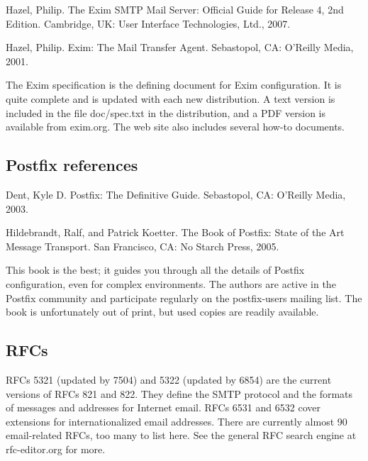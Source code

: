 {Hazel, Philip}. {The Exim SMTP Mail Server: Official Guide for Release
4, 2nd Edition}. Cambridge, UK: User Interface Technologies, Ltd., 2007.

{Hazel, Philip}. {Exim: The Mail Transfer Agent}. Sebastopol, CA:
O'Reilly Media, 2001.

The Exim specification is the defining document for Exim configuration.
It is quite complete and is updated with each new distribution. A text
version is included in the file {doc/spec.txt} in the distribution, and
a PDF version is available from {exim.org}. The web site also includes
several how-to documents.

\protect\hypertarget{part0026_split_068.html}{}{}

\hypertarget{part0026_split_068.htmlux5cux23_idContainer1247}{}
\hypertarget{part0026_split_068.htmlux5cux23calibre_pb_67}{%
\subsection[Postfix
references]{\texorpdfstring{\protect\hypertarget{part0026_split_068.htmlux5cux23_idTextAnchor1205}{}{}Postfix
references}{Postfix references}}\label{part0026_split_068.htmlux5cux23calibre_pb_67}}

{Dent, Kyle D}. {Postfix: The Definitive Guide}. Sebastopol, CA:
O'Reilly Media, 2003.

{Hildebrandt, Ralf, and Patrick Koetter. }{The Book of Postfix: State of
the Art Message Transport.} San Francisco, CA: No Starch Press, 2005.

This book is the best; it guides you through all the details of Postfix
configuration, even for complex environments. The authors are active in
the Postfix community and participate regularly on the postfix-users
mailing list. The book is unfortunately out of print, but used copies
are readily available.

\protect\hypertarget{part0026_split_069.html}{}{}

\hypertarget{part0026_split_069.htmlux5cux23_idContainer1247}{}
\hypertarget{part0026_split_069.htmlux5cux23calibre_pb_68}{%
\subsection[RFCs]{\texorpdfstring{\protect\hypertarget{part0026_split_069.htmlux5cux23_idTextAnchor1206}{}{}RFCs}{RFCs}}\label{part0026_split_069.htmlux5cux23calibre_pb_68}}

RFCs 5321 (updated by 7504) and 5322 (updated by 6854) are the current
versions of RFCs 821 and 822. They define the SMTP protocol and the
formats of messages and addresses for Internet email. RFCs 6531 and 6532
cover extensions for internationalized email addresses. There are
currently almost 90 email-related RFCs, too many to list here. See the
general RFC search engine at rfc-editor.org for more.
